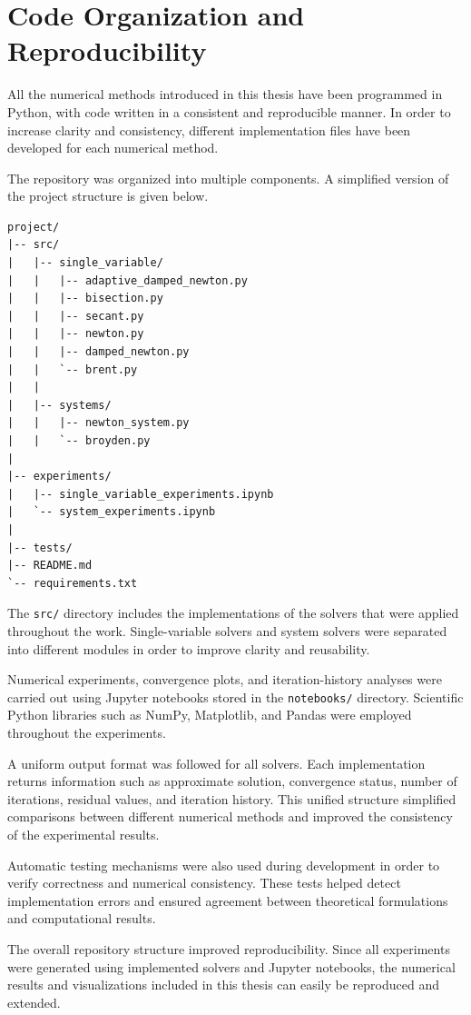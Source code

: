 \section{Code Organization and Reproducibility}

All the numerical methods introduced in this thesis have been programmed in Python, with code written in a consistent and reproducible manner. In order to increase clarity and consistency, different implementation files have been developed for each numerical method.

The repository was organized into multiple components. A simplified version of the project structure is given below.

\begin{verbatim}
project/
|-- src/
|   |-- single_variable/
|   |   |-- adaptive_damped_newton.py
|   |   |-- bisection.py
|   |   |-- secant.py
|   |   |-- newton.py
|   |   |-- damped_newton.py
|   |   `-- brent.py
|   |
|   |-- systems/
|   |   |-- newton_system.py
|   |   `-- broyden.py
|
|-- experiments/
|   |-- single_variable_experiments.ipynb
|   `-- system_experiments.ipynb
|
|-- tests/
|-- README.md
`-- requirements.txt
\end{verbatim}

The \texttt{src/} directory includes the implementations of the solvers that were applied throughout the work. Single-variable solvers and system solvers were separated into different modules in order to improve clarity and reusability.

Numerical experiments, convergence plots, and iteration-history analyses were carried out using Jupyter notebooks stored in the \texttt{notebooks/} directory. Scientific Python libraries such as NumPy, Matplotlib, and Pandas were employed throughout the experiments.

A uniform output format was followed for all solvers. Each implementation returns information such as approximate solution, convergence status, number of iterations, residual values, and iteration history. This unified structure simplified comparisons between different numerical methods and improved the consistency of the experimental results.

Automatic testing mechanisms were also used during development in order to verify correctness and numerical consistency. These tests helped detect implementation errors and ensured agreement between theoretical formulations and computational results.

The overall repository structure improved reproducibility. Since all experiments were generated using implemented solvers and Jupyter notebooks, the numerical results and visualizations included in this thesis can easily be reproduced and extended.

